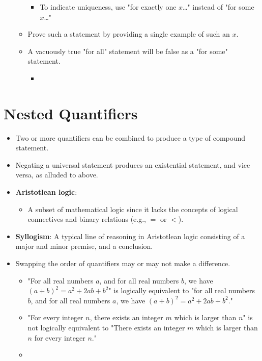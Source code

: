 \documentclass[../main.tex]{subfiles}
\begin{document}
\begin{itemize}
\begin{itemize}
        \begin{itemize}
            \item To indicate uniqueness, use "for exactly one $x$\dots" instead of "for some $x$\dots"
        \end{itemize}
        \item Prove such a statement by providing a single example of such an $x$.
        \item A vacuously true "for all" statement will be false as a "for some" statement.
        \begin{itemize}
            \item {}
        \end{itemize}
    \end{itemize}
\end{itemize}



\section{Nested Quantifiers}
\begin{itemize}
    \item {}Two or more quantifiers can be combined to produce a type of compound statement.
    \item Negating a universal statement produces an existential statement, and vice versa, as alluded to above.
    \item {}\textbf{Aristotlean logic}: 
    \begin{itemize}
        \item A subset of mathematical logic since it lacks the concepts of logical connectives and binary relations (e.g., $=$ or $<$).
    \end{itemize}
    \item \textbf{Syllogism}: A typical line of reasoning in Aristotlean logic consisting of a major and minor premise, and a conclusion.
    \item Swapping the order of quantifiers may or may not make a difference.
    \begin{itemize}
        \item "For all real numbers $a$, and for all real numbers $b$, we have $(a+b)^2=a^2+2ab+b^2$" is logically equivalent to "for all real numbers $b$, and for all real numbers $a$, we have $(a+b)^2=a^2+2ab+b^2$."
        \item "For every integer $n$, there exists an integer $m$ which is larger than $n$" is not logically equivalent to "There exists an integer $m$ which is larger than $n$ for every integer $n$."
        \item {}
    \end{itemize}
\end{itemize}
\end{document}
